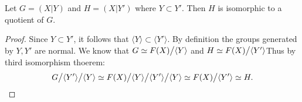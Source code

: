 \begin{proposition}
  Let $G=(X|Y)$ and $H=(X|Y')$ where $Y\subset Y'$. Then $H$ is isomorphic to a quotient of $G$.  
\end{proposition}
\begin{proof}
  Since $Y\subset Y'$, it follows that $\langle Y \rangle \subset \langle Y' \rangle$. By definition the groups generated by $Y,Y'$ are normal. We know that $G \simeq F(X)\bign/\langle Y \rangle$ and $H\simeq F(X)\bign/ \langle Y' \rangle$Thus by third isomorphism thoerem:
  \begin{align*}
    G\bign/\langle Y' \rangle\bign/\langle Y \rangle \simeq F(X)\bign/\langle Y \rangle\bign/\langle Y' \rangle\bign/\langle Y \rangle \simeq F(X)\bign/\langle Y' \rangle \simeq H.
  \end{align*}
\end{proof}
